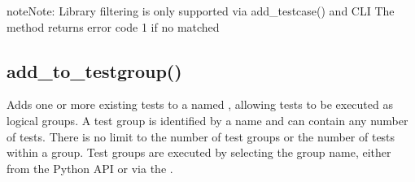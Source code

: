 \documentclass[letterpaper,10pt,english]{sphinxmanual}
\begin{document}
\sphinxAtStartPar
{}

\begin{sphinxVerbatim}[commandchars=\\\{\}]




\end{sphinxVerbatim}

\begin{sphinxadmonition}{note}{Note:}
\sphinxAtStartPar
Library filtering is only supported via add\_testcase() and CLI
The  method returns error code 1 if no  matched
\end{sphinxadmonition}


\subsection{add\_to\_testgroup()}
\label{\detokenize{api:add-to-testgroup}}
\sphinxAtStartPar
Adds one or more existing tests to a named {\hyperref[\detokenize{intro:test-group}]{}}, allowing tests to be executed as logical groups.
A test group is identified by a name and can contain any number of tests. There is no limit to the number of test groups or
the number of tests within a group. Test groups are executed by selecting the group name, either from the Python API or
via the {\hyperref[\detokenize{cli::doc}]{}}.

\begin{sphinxVerbatim}[commandchars=\\\{\}]
    \PYG{p}{[}\PYG{p}{]}
\end{sphinxVerbatim}
\end{document}
